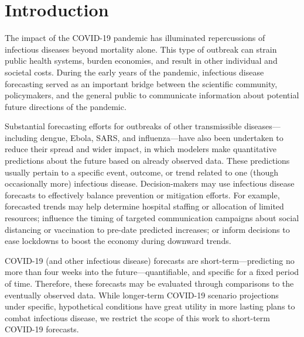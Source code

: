 \documentclass[thesis]{umassthesis}  %
\begin{document}
\tableofcontents                %
\listoftables                   %
\listoffigures                  %



\mainmatter   %

\chapter{Introduction} \label{Introduction}
The impact of the COVID-19 pandemic has illuminated repercussions of infectious diseases beyond mortality alone. This type of outbreak can strain public health systems, burden economies, and result in other individual and societal costs. During the early years of the pandemic, infectious disease forecasting served as an important bridge between the scientific community, policymakers, and the general public to communicate information about potential future directions of the pandemic.

Substantial forecasting efforts for outbreaks of other transmissible diseases---\newline including dengue, Ebola, SARS, and influenza---have also been undertaken to reduce their spread and wider impact\cite{lauer}, in which modelers make quantitative predictions about the future based on already observed data. These predictions usually pertain to a specific event, outcome, or trend related to one (though occasionally more) infectious disease\cite{lauer}. Decision-makers may use infectious disease forecasts to effectively balance prevention or mitigation efforts\cite{disease_economics}. For example, forecasted trends may help determine hospital staffing or allocation of limited resources; influence the timing of targeted communication campaigns about social distancing or vaccination to pre-date predicted increases; or inform decisions to ease lockdowns to boost the economy during downward trends.

COVID-19 (and other infectious disease) forecasts are short-term---predicting no more than four weeks into the future---quantifiable, and specific for a fixed period of time. Therefore, these forecasts may be evaluated through comparisons to the eventually observed data\cite{cramer, lauer}. While longer-term COVID-19 scenario projections under specific, hypothetical conditions have great utility in more lasting plans to combat infectious disease, we restrict the scope of this work to short-term COVID-19 forecasts.
\end{document}
